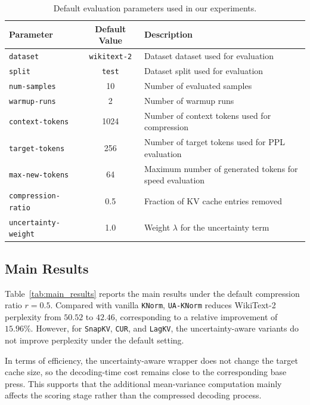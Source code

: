 \documentclass{article}
\begin{document}
\begin{table}[!htbp]
\centering
\caption{Default evaluation parameters used in our experiments.}
\label{tab:default_params}
\begin{tabular}{l c l}
\toprule
Parameter & Default Value & Description \\
\midrule
\texttt{dataset} & \texttt{wikitext-2} & Dataset dataset used for evaluation \\
\texttt{split} & \texttt{test} & Dataset split used for evaluation \\
\texttt{num-samples} & 10 & Number of evaluated samples \\
\texttt{warmup-runs} & 2 & Number of warmup runs \\
\texttt{context-tokens} & 1024 & Number of context tokens used for compression \\
\texttt{target-tokens} & 256 & Number of target tokens used for PPL evaluation \\
\texttt{max-new-tokens} & 64 & Maximum number of generated tokens for speed evaluation \\
\texttt{compression-ratio} & 0.5 & Fraction of KV cache entries removed \\
\texttt{uncertainty-weight} & 1.0 & Weight $\lambda$ for the uncertainty term \\
\bottomrule
\end{tabular}
\end{table}

\subsection{Main Results}
\label{subsec:main_results}

Table~\ref{tab:main_results} reports the main results under the default compression ratio $r=0.5$.
Compared with vanilla \texttt{KNorm}, \texttt{UA-KNorm} reduces WikiText-2 perplexity from $50.52$ to $42.46$, corresponding to a relative improvement of $15.96\%$.
However, for \texttt{SnapKV}, \texttt{CUR}, and \texttt{LagKV}, the uncertainty-aware variants do not improve perplexity under the default setting.

In terms of efficiency, the uncertainty-aware wrapper does not change the target cache size, so the decoding-time cost remains close to the corresponding base press.
This supports that the additional mean-variance computation mainly affects the scoring stage rather than the compressed decoding process.
\end{document}
